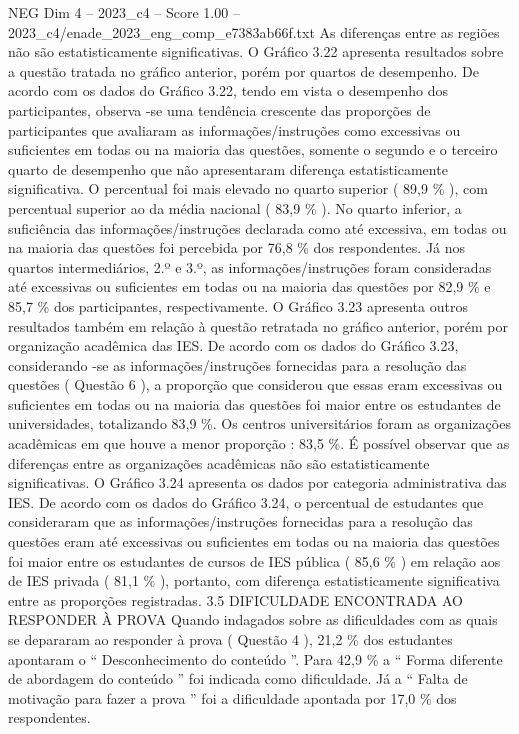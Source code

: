 \begin{textsample}{NEG Dim 4 – 2023\_c4 – Score 1.00 – 2023\_c4/enade\_2023\_eng\_comp\_e7383ab66f.txt}
As diferenças entre as regiões não são estatisticamente significativas.
O Gráfico 3.22 apresenta resultados sobre a questão tratada no gráfico anterior, porém por quartos de desempenho.
De acordo com os dados do Gráfico 3.22, tendo em vista o desempenho dos participantes, observa -se uma tendência crescente das proporções de participantes que avaliaram as informações/instruções como excessivas ou suficientes em todas ou na maioria das questões, somente o segundo e o terceiro quarto de desempenho que não apresentaram diferença estatisticamente significativa.
O percentual foi mais elevado no quarto superior ( 89,9 \% ), com percentual superior ao da média nacional ( 83,9 \% ).
No quarto inferior, a suficiência das informações/instruções declarada como até excessiva, em todas ou na maioria das questões foi percebida por 76,8 \% dos respondentes.
Já nos quartos intermediários, 2.º e 3.º, as informações/instruções foram consideradas até excessivas ou suficientes em todas ou na maioria das questões por 82,9 \% e 85,7 \% dos participantes, respectivamente.
O Gráfico 3.23 apresenta outros resultados também em relação à questão retratada no gráfico anterior, porém por organização acadêmica das IES.
De acordo com os dados do Gráfico 3.23, considerando -se as informações/instruções fornecidas para a resolução das questões ( Questão 6 ), a proporção que considerou que essas eram excessivas ou suficientes em todas ou na maioria das questões foi maior entre os estudantes de universidades, totalizando 83,9 \%.
Os centros universitários foram as organizações acadêmicas em que houve a menor proporção : 83,5 \%.
É possível observar que as diferenças entre as organizações acadêmicas não são estatisticamente significativas.
O Gráfico 3.24 apresenta os dados por categoria administrativa das IES.
De acordo com os dados do Gráfico 3.24, o percentual de estudantes que consideraram que as informações/instruções fornecidas para a resolução das questões eram até excessivas ou suficientes em todas ou na maioria das questões foi maior entre os estudantes de cursos de IES pública ( 85,6 \% ) em relação aos de IES privada ( 81,1 \% ), portanto, com diferença estatisticamente significativa entre as proporções registradas. 3.5 DIFICULDADE ENCONTRADA AO RESPONDER À PROVA Quando indagados sobre as dificuldades com as quais se depararam ao responder à prova ( Questão 4 ), 21,2 \% dos estudantes apontaram o “ Desconhecimento do conteúdo ”.
Para 42,9 \% a “ Forma diferente de abordagem do conteúdo ” foi indicada como dificuldade.
Já a “ Falta de motivação para fazer a prova ” foi a dificuldade apontada por 17,0 \% dos respondentes.

\end{textsample}
